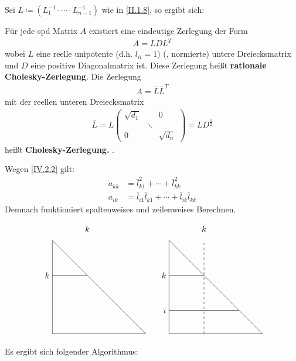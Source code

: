 Sei $L\coloneqq (L_1^{-1}\cdot \cdots \cdot L_{n-1}^{-1})$ wie in \eqref{II.1.8}, so ergibt sich:



\begin{Fole}
  \label{4.2.2}
  Für jede spd Matrix $A$ existiert eine eindeutige Zerlegung der Form 
  \begin{gather*}
    A= LDL^T
  \end{gather*}
  wobei $L$ eine reelle unipotente (d.h. $l_{ii}=1$)  (, normierte)  untere 
  Dreiecksmatrix  und $D$ eine positive Diagonalmatrix ist. 
  Diese Zerlegung heißt \textbf{rationale Cholesky-Zerlegung}. Die Zerlegung
  \begin{gather}
    A= \bar{L}\bar{L}^T 
    \label{IV.2.2}
  \end{gather}
  mit der reellen unteren Dreiecksmatrix
  \begin{gather*}
    \bar{L} = L \begin{pmatrix}
      \sqrt{d_1} &&0 \\
      & \ddots & \\
      0&& \sqrt{d_n}
    \end{pmatrix} = LD^{\frac{1}{2}}
  \end{gather*}
  heißt \textbf{Cholesky-Zerlegung.} .
  
  Wegen \eqref{IV.2.2} gilt: 
  \begin{align}
    a_{kk} &= \bar{l}_{k1}^{2} + \cdots +  \bar{l}_{kk}^2  \label{IV.2.3} \\
    a_{ik} &= \bar{l}_{i1} \bar{l}_{k1} + \cdots + \bar{l}_{ik} \bar{l}_{kk}  \label{IV.2.4}
  \end{align}
  Demnach funktioniert spaltenweises und zeilenweises Berechnen. 
  
  \begin{gather*}
    \begin{tikzpicture}
      \foreach \x in {0,5}
      {
        \draw (\x,0) -- (\x+4,0) -- (\x,4) -- cycle;
        \draw (\x,2.5) node[left] {$k$} -- (\x+1.5,2.5);
        \draw (\x+1.5,4.5) node {$k$};
      }
      \draw[dash pattern=on 3pt off 3pt] (6.5,0) -- (6.5,4);
      \draw (5,1) node[left] {$i$} -- (8,1);
    \end{tikzpicture}
  \end{gather*}
\end{Fole}

Es ergibt sich folgender Algorithmus:


